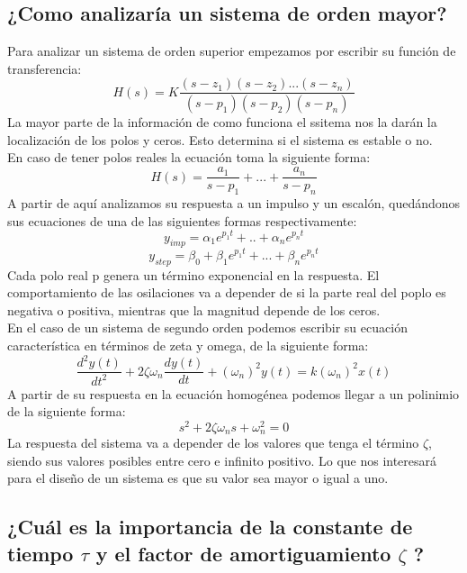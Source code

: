 \subsection{¿Como analizaría un sistema de orden mayor?}
Para analizar un sistema de orden superior empezamos por escribir su función de transferencia:
\begin{equation}
H(s)=K\frac{(s-z_1)(s-z_2)...(s-z_n)}{(s-p_1)(s-p_2)(s-p_n)}
\end{equation} 
La mayor parte de la información de como funciona el ssitema nos la darán la localización de los polos y ceros. Esto determina si el sistema es estable o no.\\
En caso de tener polos reales la ecuación toma la siguiente forma:
\begin{equation}
H(s)=\frac{a_1}{s-p_1}+...+\frac{a_n}{s-p_n}
\end{equation}
A partir de aquí analizamos su respuesta a un impulso y un escalón, quedándonos sus ecuaciones de una de las siguientes formas respectivamente:
\begin{equation}
y_{imp}=\alpha_1 e^{p_1t}+..+\alpha_n e^{p_nt}
\end{equation}
\begin{equation}
y_{step}=\beta_0 + \beta_1 e^{p_1t}+...+ \beta_n e^{p_nt}
\end{equation}
Cada polo real p genera un término exponencial en la respuesta. El comportamiento de las osilaciones va a depender de si la parte real del poplo es negativa o positiva, mientras que la magnitud depende de los ceros.\\
En el caso de un sistema de segundo orden podemos escribir su ecuación característica en términos de zeta y omega, de la siguiente forma:
\begin{equation}
\frac{d^2y(t)}{dt^2}+2\zeta \omega_n \frac{dy(t)}{dt}+(\omega_n)^2y(t)=k(\omega_n)^2x(t)
\end{equation}
A partir de su respuesta en la ecuación homogénea podemos llegar a un polinimio de la siguiente forma:
\begin{equation}
s^2+2\zeta\omega_ns+\omega^2_n=0
\end{equation}
La respuesta del sistema va a depender de los valores que tenga el término $\zeta$, siendo sus valores posibles entre cero e infinito positivo. Lo que nos interesará para el diseño de un sistema es que su valor sea mayor o igual a uno.
\subsection{¿Cuál es la importancia de la constante de tiempo $\tau$ y el factor de amortiguamiento $\zeta$ ?}

